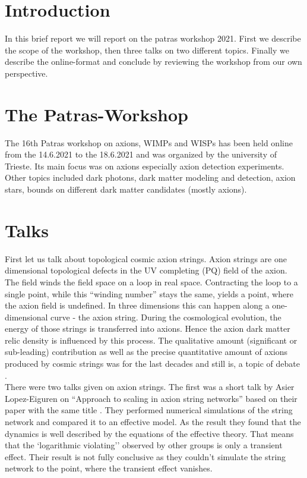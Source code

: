 \documentclass[a4paper]{article}
\begin{document}
\section{Introduction}
In this brief report we will report on the patras workshop 2021.
First we describe the scope of the workshop, then three talks on two different topics.
Finally we describe the online-format and conclude by reviewing the workshop from our own perspective.

\section{The Patras-Workshop}
The 16th Patras workshop on axions, WIMPs and WISPs has been held online from the 14.6.2021 to the 18.6.2021 and was organized by the university of Trieste.
Its main focus was on axions especially axion detection experiments.
Other topics included dark photons, dark matter modeling and
detection,  axion stars,  bounds on different dark matter candidates (mostly axions).

\section{Talks}
First let us talk about topological cosmic axion strings.
Axion strings are one dimensional topological defects in the UV completing
(PQ) field of the axion. The field winds the field space on a loop
in real space. Contracting the loop to a single point, while this ``winding number'' stays the same, yields a point, where the axion field is undefined. In three dimensions this can happen along a one-dimensional curve - the axion string.
During the cosmological evolution, the energy of those strings is transferred into axions.
Hence the axion dark matter relic density is influenced by this process.
The qualitative amount (significant or sub-leading) contribution as well as the precise quantitative amount
of axions produced by cosmic strings was for the last decades and still is, a topic of debate  \cite{Gorghetto_2018}. \\


\noindent
There were two talks given on axion strings.
The first was a short talk by Asier Lopez-Eiguren on ``Approach to scaling in axion string networks'' based on their paper with the same title \cite{Hindmarsh_2021}.
They performed numerical simulations of the string network and compared it to an effective
model. As the result they found that the dynamics is well described by the equations of the effective theory. That means that the `logarithmic violating'' observed by other groups is only a transient effect.
Their result is not fully conclusive as they couldn't simulate the string network to the point, where
the transient effect vanishes. \\
\end{document}
